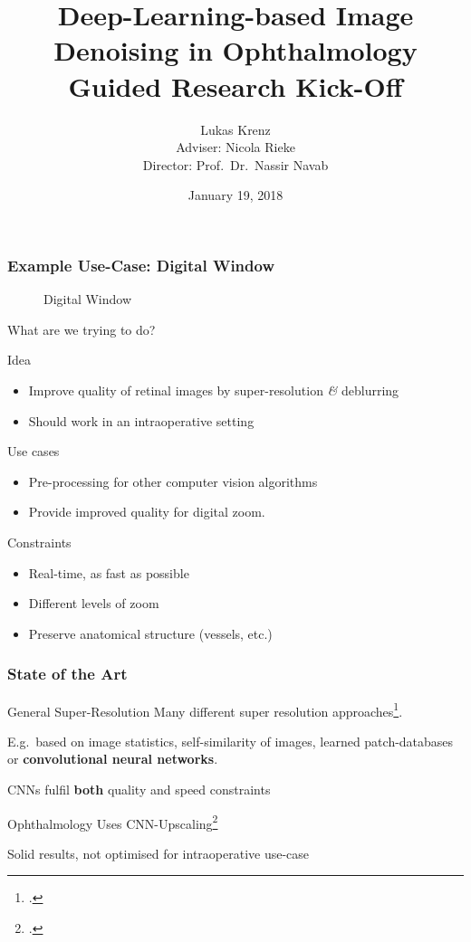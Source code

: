 \documentclass{beamer}
\title{Deep-Learning-based Image Denoising in Ophthalmology\\Guided Research Kick-Off}
\author{Lukas Krenz\\Adviser: Nicola Rieke\\Director: Prof.\ Dr.\ Nassir Navab}
\date{January 19, 2018}
\institute{TUM, Chair for Computer Aided Medical Procedures \textit{\&} Augmented Reality}
\begin{document}
\maketitle

\begin{frame}
  \frametitle{Example Use-Case: Digital Window}
   \begin{figure}[h]
    \centering
    \caption*{Digital Window}
    \label{fig:digital-window}
  \end{figure}
\end{frame}


\begin{frame}{What are we trying to do?}
\begin{block}{Idea}
\begin{itemize}
\item Improve quality of retinal images by super-resolution \textit{\&} deblurring
\item Should work in an intraoperative setting
\end{itemize}
\end{block}

\begin{block}{Use cases}
\begin{itemize}
\item Pre-processing for other computer vision algorithms
\item Provide improved quality for digital zoom.
\end{itemize}
\end{block}

\begin{block}{Constraints}
  \begin{itemize}
  \item Real-time, as fast as possible
  \item Different levels of zoom
  \item Preserve anatomical structure (vessels, etc.)
  \end{itemize}
\end{block}
\end{frame}

\begin{frame}
  \frametitle{State of the Art}

\begin{block}{General Super-Resolution}
Many different super resolution approaches\footcite{SRsurvey}.
    
E.g.\ based on image statistics, self-similarity of images, learned patch-databases or \textbf{convolutional neural networks}.

CNNs fulfil \textbf{both} quality and speed constraints
\end{block}


\begin{block}{Ophthalmology}
Uses CNN-Upscaling\footcite{SaliencyGAN} 

Solid results, not optimised for intraoperative use-case
\end{block}
\end{frame}
\end{document}
